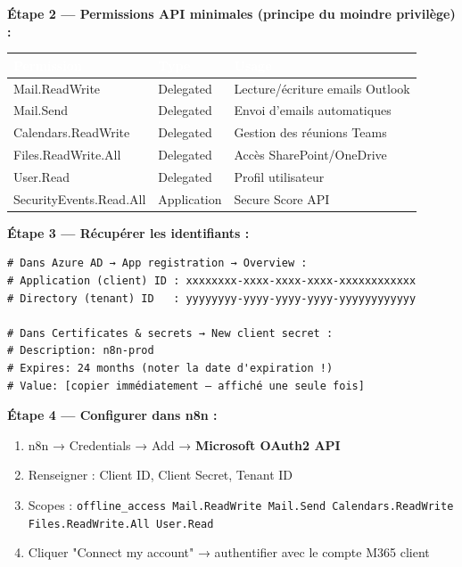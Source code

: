\documentclass[11pt, a4paper]{article}
\begin{document}
\textbf{Étape 2 — Permissions API minimales (principe du moindre privilège) :}

\begin{center}
\renewcommand{\arraystretch}{1.4}
\begin{tabularx}{\linewidth}{>{\ttfamily\small}p{5.5cm} p{2.2cm} X}
\toprule
\rowcolor{tabheader}
\textcolor{white}{\textbf{Permission}} & \textcolor{white}{\textbf{Type}} & \textcolor{white}{\textbf{Usage}} \\
\midrule
Mail.ReadWrite & Delegated & Lecture/écriture emails Outlook \\
\rowcolor{rowgray}
Mail.Send & Delegated & Envoi d'emails automatiques \\
Calendars.ReadWrite & Delegated & Gestion des réunions Teams \\
\rowcolor{rowgray}
Files.ReadWrite.All & Delegated & Accès SharePoint/OneDrive \\
User.Read & Delegated & Profil utilisateur \\
\rowcolor{rowgray}
SecurityEvents.Read.All & Application & Secure Score API \\
\bottomrule
\end{tabularx}
\end{center}

\textbf{Étape 3 — Récupérer les identifiants :}
\begin{lstlisting}[style=terminal]
# Dans Azure AD → App registration → Overview :
# Application (client) ID : xxxxxxxx-xxxx-xxxx-xxxx-xxxxxxxxxxxx
# Directory (tenant) ID   : yyyyyyyy-yyyy-yyyy-yyyy-yyyyyyyyyyyy

# Dans Certificates & secrets → New client secret :
# Description: n8n-prod
# Expires: 24 months (noter la date d'expiration !)
# Value: [copier immédiatement — affiché une seule fois]
\end{lstlisting}

\textbf{Étape 4 — Configurer dans n8n :}
\begin{enumerate}
  \item n8n → Credentials → Add → \textbf{Microsoft OAuth2 API}
  \item Renseigner : Client ID, Client Secret, Tenant ID
  \item Scopes : \texttt{offline\_access Mail.ReadWrite Mail.Send Calendars.ReadWrite Files.ReadWrite.All User.Read}
  \item Cliquer "Connect my account" → authentifier avec le compte M365 client
\end{enumerate}
\end{document}
